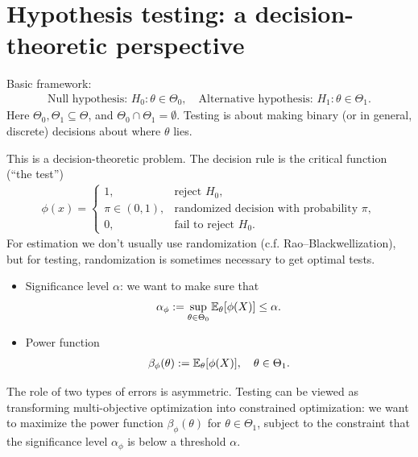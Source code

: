 \documentclass[11pt,letterpaper]{article}
\numberwithin{theorem}{lecture}
\numberwithin{proposition}{lecture}
\numberwithin{lemma}{lecture}
\numberwithin{claim}{lecture}
\numberwithin{corollary}{lecture}
\numberwithin{definition}{lecture}
\numberwithin{conjecture}{lecture}
\numberwithin{remark}{lecture}
\numberwithin{example}{lecture}
\numberwithin{equation}{lecture}
\begin{document}
\section{Hypothesis testing: a decision-theoretic perspective}
Basic framework:
\begin{align*}
  \text{Null hypothesis: } H_0: \theta \in \Theta_0, \quad \text{Alternative hypothesis: } H_1: \theta \in \Theta_1.
\end{align*}
Here $\Theta_0, \Theta_1 \subseteq \Theta$, and $\Theta_0 \cap \Theta_1 = \emptyset$. Testing is about making binary (or in general, discrete) decisions about where $\theta$ lies.

This is a decision-theoretic problem. The decision rule is the critical function (``the test'')
\begin{align*}
  \phi (x) = \begin{cases}
    1, & \text{reject } H_0,\\
    \pi \in (0, 1), & \text{randomized decision with probability } \pi,\\
    0, & \text{fail to reject } H_0.
  \end{cases}
\end{align*}
For estimation we don't usually use randomization (c.f. Rao--Blackwellization), but for testing, randomization is sometimes necessary to get optimal tests.

\begin{itemize}
  \item Significance level $\alpha$: we want to make sure that
  \begin{align*}
    \alpha_\phi := \sup_{\theta \in \Theta_0} {\mathbb{E}}_\theta [\phi (X)] \leq \alpha.
  \end{align*}
  \item Power function
  \begin{align*}
    \beta_\phi (\theta) := {\mathbb{E}}_{\theta} [\phi (X)], \quad \theta \in \Theta_1.
  \end{align*}
\end{itemize}
The role of two types of errors is asymmetric. Testing can be viewed as transforming multi-objective optimization into constrained optimization: we want to maximize the power function $\beta_\phi (\theta)$ for $\theta \in \Theta_1$, subject to the constraint that the significance level $\alpha_\phi$ is below a threshold $\alpha$.
\end{document}
